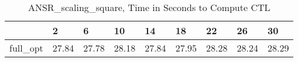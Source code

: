 \begin{table}
\caption{ANSR\_scaling\_square, Time in Seconds to Compute CTL}
\label{ANSR_scaling_square_CTL_time}
\begin{tabular}{lllllllll}
\toprule
 & 2 & 6 & 10 & 14 & 18 & 22 & 26 & 30 \\
\midrule
full\_opt & 27.84 & 27.78 & 28.18 & 27.84 & 27.95 & 28.28 & 28.24 & 28.29 \\
\bottomrule
\end{tabular}
\end{table}
